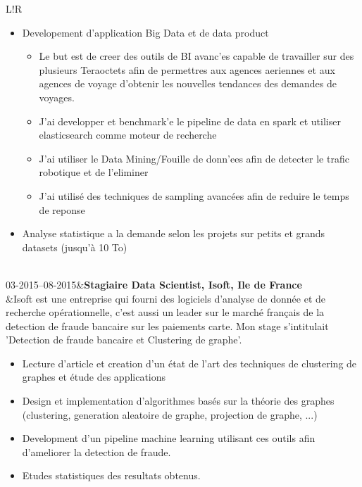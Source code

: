 \documentclass[6pt]{article}
\newcommand\VRule{\color{lightgray}\vrule width 0.5pt}
\begin{document}
\begin{tabular}{L!{\VRule}R}
\begin{itemize}
	\item Developement d'application Big Data et de data product
		\begin{itemize}
		\item Le but est de creer des outils de BI avanc'es capable de travailler sur des plusieurs Teraoctets afin de permettres aux agences aeriennes et aux agences de voyage d'obtenir les nouvelles tendances des demandes de voyages.
		\item J'ai developper et benchmark'e le pipeline de data en spark et utiliser elasticsearch comme moteur de recherche
		\item J'ai utiliser le Data Mining/Fouille de donn'ees afin de detecter le trafic robotique et de l'eliminer
		\item J'ai utilis\'{e} des techniques de sampling avanc\'{e}es afin de reduire le temps de reponse
		\end{itemize}
	\item Analyse statistique a la demande selon les projets sur petits et grands datasets (jusqu'\`{a} 10 To)
\end{itemize}

\\[5pt]
03-2015--08-2015&\textbf{Stagiaire Data Scientist, Isoft, Ile de France}\\
	&Isoft est une entreprise qui fourni des logiciels d'analyse de donn\'{e}e et de recherche op\'{e}rationnelle, c'est aussi un leader sur le march\'{e} fran\c{c}ais de la detection de fraude bancaire sur les paiements carte. Mon stage s'intitulait 'Detection de fraude bancaire et Clustering de graphe'.
	\begin{itemize}
		\item Lecture d'article et creation d'un \'{e}tat de l'art des techniques de clustering de graphes et \'{e}tude des applications 
		\item Design et implementation d'algorithmes bas\'{e}s sur la th\'{e}orie des graphes (clustering, generation aleatoire de graphe, projection de graphe, ...) 
		\item Development d'un pipeline machine learning utilisant ces outils afin d'ameliorer la detection de fraude.
		\item Etudes statistiques des resultats obtenus.
	\end{itemize}


\end{tabular}
\end{document}
